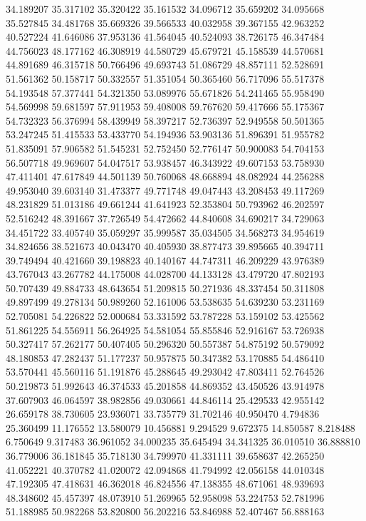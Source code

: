 34.189207
35.317102
35.320422
35.161532
34.096712
35.659202
34.095668
35.527845
34.481768
35.669326
39.566533
40.032958
39.367155
42.963252
40.527224
41.646086
37.953136
41.564045
40.524093
38.726175
46.347484
44.756023
48.177162
46.308919
44.580729
45.679721
45.158539
44.570681
44.891689
46.315718
50.766496
49.693743
51.086729
48.857111
52.528691
51.561362
50.158717
50.332557
51.351054
50.365460
56.717096
55.517378
54.193548
57.377441
54.321350
53.089976
55.671826
54.241465
55.958490
54.569998
59.681597
57.911953
59.408008
59.767620
59.417666
55.175367
54.732323
56.376994
58.439949
58.397217
52.736397
52.949558
50.501365
53.247245
51.415533
53.433770
54.194936
53.903136
51.896391
51.955782
51.835091
57.906582
51.545231
52.752450
52.776147
50.900083
54.704153
56.507718
49.969607
54.047517
53.938457
46.343922
49.607153
53.758930
47.411401
47.617849
44.501139
50.760068
48.668894
48.082924
44.256288
49.953040
39.603140
31.473377
49.771748
49.047443
43.208453
49.117269
48.231829
51.013186
49.661244
41.641923
52.353804
50.793962
46.202597
52.516242
48.391667
37.726549
54.472662
44.840608
34.690217
34.729063
34.451722
33.405740
35.059297
35.999587
35.034505
34.568273
34.954619
34.824656
38.521673
40.043470
40.405930
38.877473
39.895665
40.394711
39.749494
40.421660
39.198823
40.140167
44.747311
46.209229
43.976389
43.767043
43.267782
44.175008
44.028700
44.133128
43.479720
47.802193
50.707439
49.884733
48.643654
51.209815
50.271936
48.337454
50.311808
49.897499
49.278134
50.989260
52.161006
53.538635
54.639230
53.231169
52.705081
54.226822
52.000684
53.331592
53.787228
53.159102
53.425562
51.861225
54.556911
56.264925
54.581054
55.855846
52.916167
53.726938
50.327417
57.262177
50.407405
50.296320
50.557387
54.875192
50.579092
48.180853
47.282437
51.177237
50.957875
50.347382
53.170885
54.486410
53.570441
45.560116
51.191876
45.288645
49.293042
47.803411
52.764526
50.219873
51.992643
46.374533
45.201858
44.869352
43.450526
43.914978
37.607903
46.064597
38.982856
49.030661
44.846114
25.429533
42.955142
26.659178
38.730605
23.936071
33.735779
31.702146
40.950470
4.794836
25.360499
11.176552
13.580079
10.456881
9.294529
9.672375
14.850587
8.218488
6.750649
9.317483
36.961052
34.000235
35.645494
34.341325
36.010510
36.888810
36.779006
36.181845
35.718130
34.799970
41.331111
39.658637
42.265250
41.052221
40.370782
41.020072
42.094868
41.794992
42.056158
44.010348
47.192305
47.418631
46.362018
46.824556
47.138355
48.671061
48.939693
48.348602
45.457397
48.073910
51.269965
52.958098
53.224753
52.781996
51.188985
50.982268
53.820800
56.202216
53.846988
52.407467
56.888163
